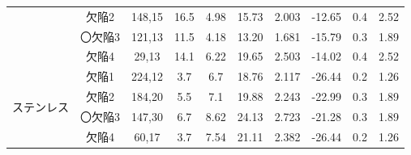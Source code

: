 \begin{table}[htbp]
{\begin{tabular}{|cc|ccc|ccccc|}
    \multicolumn{1}{|c|}{}                       & 欠陥2     & \multicolumn{1}{c|}{148,15}    & \multicolumn{1}{c|}{16.5}        & 4.98          & \multicolumn{1}{c|}{15.73}  & \multicolumn{1}{c|}{2.003} & \multicolumn{1}{c|}{-12.65}   & \multicolumn{1}{c|}{0.4} & 2.52  \\ \cline{2-10} 
    \multicolumn{1}{|c|}{}                       & 〇欠陥3    & \multicolumn{1}{c|}{121,13}    & \multicolumn{1}{c|}{11.5}        & 4.18          & \multicolumn{1}{c|}{13.20}  & \multicolumn{1}{c|}{1.681} & \multicolumn{1}{c|}{-15.79}   & \multicolumn{1}{c|}{0.3} & 1.89  \\ \cline{2-10} 
    \multicolumn{1}{|c|}{}                       & 欠陥4     & \multicolumn{1}{c|}{29,13}     & \multicolumn{1}{c|}{14.1}        & 6.22          & \multicolumn{1}{c|}{19.65}  & \multicolumn{1}{c|}{2.503} & \multicolumn{1}{c|}{-14.02}   & \multicolumn{1}{c|}{0.4} & 2.52  \\ \hline
    \multicolumn{1}{|c|}{\multirow{4}{*}{ステンレス}} & 欠陥1     & \multicolumn{1}{c|}{224,12}    & \multicolumn{1}{c|}{3.7}         & 6.7           & \multicolumn{1}{c|}{18.76}  & \multicolumn{1}{c|}{2.117} & \multicolumn{1}{c|}{-26.44}   & \multicolumn{1}{c|}{0.2} & 1.26  \\ \cline{2-10} 
    \multicolumn{1}{|c|}{}                       & 欠陥2     & \multicolumn{1}{c|}{184,20}    & \multicolumn{1}{c|}{5.5}         & 7.1           & \multicolumn{1}{c|}{19.88}  & \multicolumn{1}{c|}{2.243} & \multicolumn{1}{c|}{-22.99}   & \multicolumn{1}{c|}{0.3} & 1.89  \\ \cline{2-10} 
    \multicolumn{1}{|c|}{}                       & 〇欠陥3    & \multicolumn{1}{c|}{147,30}    & \multicolumn{1}{c|}{6.7}         & 8.62          & \multicolumn{1}{c|}{24.13}  & \multicolumn{1}{c|}{2.723} & \multicolumn{1}{c|}{-21.28}   & \multicolumn{1}{c|}{0.3} & 1.89  \\ \cline{2-10} 
    \multicolumn{1}{|c|}{}                       & 欠陥4     & \multicolumn{1}{c|}{60,17}     & \multicolumn{1}{c|}{3.7}         & 7.54          & \multicolumn{1}{c|}{21.11}  & \multicolumn{1}{c|}{2.382} & \multicolumn{1}{c|}{-26.44}   & \multicolumn{1}{c|}{0.2} & 1.26  \\ \hline
    \end{tabular}
    }
\end{table}

\begin{table}[htbp]
    \centering
    \caption{Measured specimen size.}
    \label{tbl:サイズ実測値}
\end{table}

